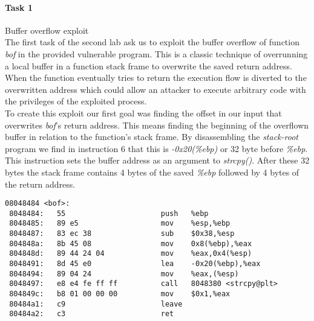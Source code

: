 



\paragraph {Task 1} Buffer overflow exploit
\\
\tab The first task of the second lab ask us to exploit the buffer overflow of function \emph{bof} in the provided vulnerable program. This is a classic technique of overrunning a local buffer in a function stack frame to overwrite the saved return address. When the function eventually tries to return the execution flow is diverted to the overwritten address which could allow an attacker to execute arbitrary code with the privileges  of the exploited process. \\
\tab To create this exploit our first goal was finding the offset in our input that overwrites \emph{bof}'s return address. This means finding the beginning of the overflown buffer in relation to the function's stack frame. By disassembling the \emph{stack-root} program we find in instruction 6 that this is \emph{-0x20(\%ebp)} or 32 byte before \emph{\%ebp}. This instruction sets the buffer address as an argument to \emph{strcpy()}. After these 32 bytes the stack frame contains 4 bytes of the saved \emph{\%ebp} followed by 4 bytes of the return address.
\begin{lstlisting}
08048484 <bof>:
 8048484:	55                   	push   %ebp
 8048485:	89 e5                	mov    %esp,%ebp
 8048487:	83 ec 38             	sub    $0x38,%esp
 804848a:	8b 45 08             	mov    0x8(%ebp),%eax
 804848d:	89 44 24 04          	mov    %eax,0x4(%esp)
 8048491:	8d 45 e0             	lea    -0x20(%ebp),%eax
 8048494:	89 04 24             	mov    %eax,(%esp)
 8048497:	e8 e4 fe ff ff       	call   8048380 <strcpy@plt>
 804849c:	b8 01 00 00 00       	mov    $0x1,%eax
 80484a1:	c9                   	leave  
 80484a2:	c3                   	ret    
\end{lstlisting}
